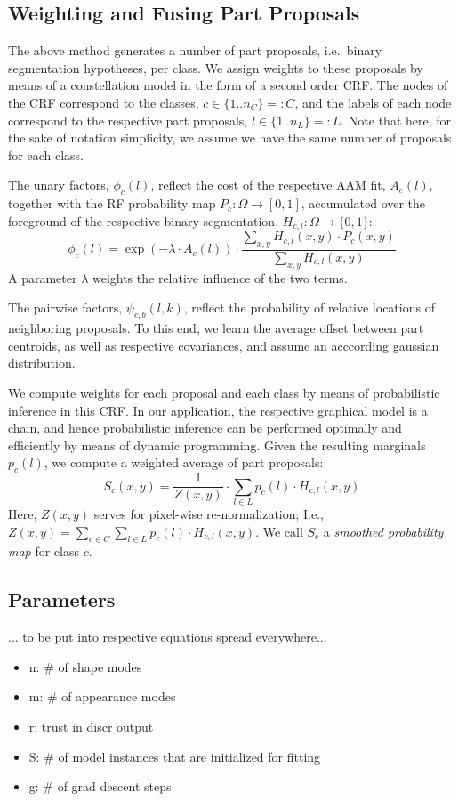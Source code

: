 \documentclass[10pt,twocolumn,letterpaper]{article}
\begin{document}
\subsection{Weighting and Fusing Part Proposals}
\label{subsec:weightsAndFusion}

The above method generates a number of part proposals, i.e.\ binary segmentation hypotheses, per class. 
%
We assign weights to these proposals by means of a constellation model in the form of a second order CRF. 
%
The nodes of the CRF correspond to the classes, $c\in \{1..n_C\}=:C$, and the labels of each node correspond to the respective part proposals, $l\in \{1..n_L\}=:L$. 
Note that here, for the sake of notation simplicity, we assume we have the same number of proposals for each class. 

The unary factors, $\phi_c(l)$, reflect the cost of the respective AAM fit, $A_c(l)$, together with the RF probability map $P_c:\Omega\rightarrow [ 0,1 ]$, accumulated over the foreground of the respective binary segmentation, $H_{c,l}: \Omega\rightarrow \{0,1\}$: 
\begin{equation}
\phi_c(l) = \exp{(-\lambda\cdot A_c(l))} \cdot \frac{\sum_{x,y} H_{c,l}(x,y)\cdot P_c(x,y)}{\sum_{x,y} H_{c,l}(x,y)}
\label{eq:unaries}
\end{equation}
A parameter $\lambda$ weights the relative influence of the two terms. 

The pairwise factors, $\psi_{c,b}(l,k)$, reflect the probability of relative locations of neighboring proposals. To this end, we learn the average offset between part centroids, as well as respective covariances, and assume an acccording gaussian distribution. 

We compute weights for each proposal and each class by means of probabilistic inference in this CRF. In our application, the respective graphical model is a chain, and hence probabilistic inference can be performed optimally and efficiently by means of dynamic programming. 
%
Given the resulting marginals $p_c(l)$, we compute a weighted average of part proposals: 
\[ S_c(x,y) = \frac{1}{Z(x,y)} \cdot \sum_{l\in L} p_c(l)\cdot H_{c,l}(x,y) \]
Here, $Z(x,y)$ serves for pixel-wise re-normalization; I.e., $Z(x,y)=\sum_{c\in C}\sum_{l\in L} p_c(l)\cdot H_{c,l}(x,y)$.
%
We call $S_c$ a \emph{smoothed probability map} for class $c$. 

\subsection{Parameters}
... to be put into respective equations spread everywhere...
\begin{itemize}
\item n: \# of shape modes
\item m: \# of appearance modes
\item r: trust in discr output
\item S: \# of model instances that are initialized for fitting
\item g: \# of grad descent steps
\end{itemize}
\end{document}
